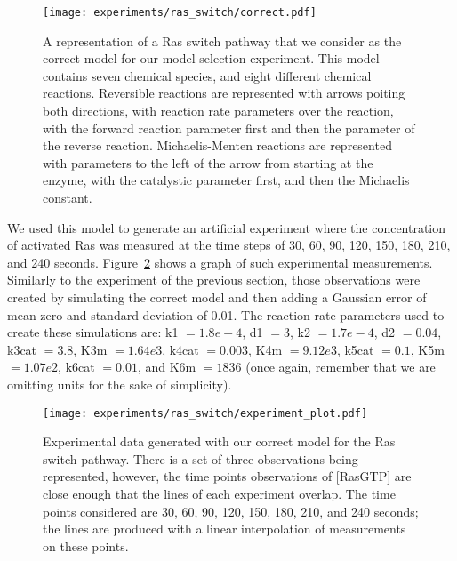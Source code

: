 \begin{figure}[ht]
\begin{center}
\texttt{[image: experiments/ras\_switch/correct.pdf]}
\caption{A representation of a Ras switch pathway that we consider as
    the correct model for our model selection experiment. This model
    contains seven chemical species, and eight different chemical
    reactions. Reversible reactions are represented with arrows poiting
    both directions, with reaction rate parameters over the reaction,
    with the forward reaction parameter first and then the parameter of
    the reverse reaction. Michaelis-Menten reactions are represented
    with parameters to the left of the arrow from starting at the
    enzyme, with the catalystic parameter first, and then the Michaelis
    constant.
}
\label{fig:ras_switch:correct_model}
\end{center}
\end{figure}

We used this model to generate an artificial experiment where the
concentration of activated Ras was measured at the time steps of 30,
60, 90, 120, 150, 180, 210, and 240 seconds.
Figure~\ref{fig:ras_switch:experimental_observations} shows a graph of
such experimental measurements. Similarly to the experiment of the 
previous section, those observations were created by simulating the 
correct model and then adding a Gaussian error of mean zero and standard
deviation of 0.01. The reaction rate parameters used to create these
simulations are: k1 $= 1.8e-4$, d1 $= 3$, k2 $= 1.7e-4$, d2 $=0.04$,
k3cat $= 3.8$, K3m $=1.64e3$, k4cat $= 0.003$, K4m $= 9.12e3$, k5cat
$= 0.1$, K5m $= 1.07e2$, k6cat $= 0.01$, and K6m $=1836$ (once again,
remember that we are omitting units for the sake of simplicity).

\begin{figure}[ht]
\begin{center}
\texttt{[image: experiments/ras\_switch/experiment\_plot.pdf]}
\caption{Experimental data generated with our correct model for the Ras
    switch pathway. There is a set of three observations being
    represented, however, the time points observations of [RasGTP] are
    close enough that the lines of each experiment overlap. The time
    points considered are 30, 60, 90, 120, 150, 180, 210, and 240
    seconds; the lines are produced with a linear interpolation of
    measurements on these points.}
\label{fig:ras_switch:experimental_observations}
\end{center}
\end{figure}

